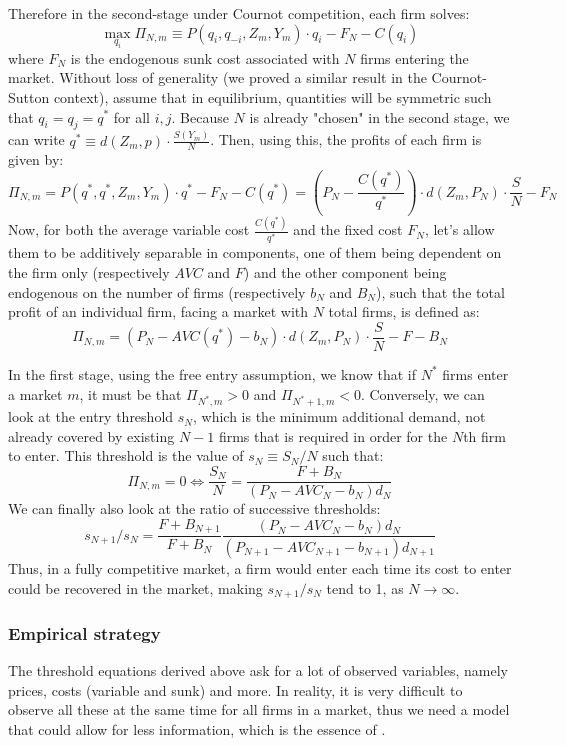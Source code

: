 \documentclass[12pt]{report}
\begin{document}
Therefore in the second-stage under Cournot competition, each firm solves: $$\max_{q_i}\Pi_{N,m} \equiv P(q_i, q_{-i}, Z_m, Y_m) \cdot q_i - F_N - C(q_i) $$ where $F_N$ is the endogenous sunk cost associated with $N$ firms entering the market. Without loss of generality (we proved a similar result in the Cournot-Sutton context), assume that in equilibrium, quantities will be symmetric such that $q_i = q_j = q^*$ for all $i,j$. Because $N$ is already "chosen" in the second stage, we can write $q^* \equiv d(Z_m, p)\cdot \frac{S(Y_m)}{N}$. Then, using this, the profits of each firm is given by: $$\Pi_{N,m} = P(q^*, q^*, Z_m, Y_m) \cdot q^* - F_N - C(q^*) = \left(P_N - \frac{C(q^*)}{q^*} \right) \cdot d(Z_m, P_N)\cdot \frac{S}{N} - F_N $$ Now, for both the average variable cost $\frac{C(q^*)}{q^*}$ and the fixed cost $F_N$, let's allow them to be additively separable in components, one of them being dependent on the firm only (respectively $AVC$ and $F$) and the other component being endogenous on the number of firms (respectively $b_N$ and $B_N$), such that the total profit of an individual firm, facing a market with $N$ total firms, is defined as: $$\Pi_{N,m} = \left(P_N - AVC(q^*) - b_N \right) \cdot d(Z_m, P_N)\cdot \frac{S}{N} - F - B_N $$

In the first stage, using the free entry assumption, we know that if $N^*$ firms enter a market $m$, it must be that $\Pi_{N^*,m} > 0$ and $\Pi_{N^*+1,m} < 0$. Conversely, we can look at the entry threshold $s_N$, which is the minimum additional demand, not already covered by existing $N-1$ firms that is required in order for the $N$th firm to enter. This threshold is the value of $s_N \equiv S_N/N$ such that: $$\Pi_{N,m} = 0 \Leftrightarrow \frac{S_N}{N} = \frac{F + B_N}{(P_N - AVC_N - b_N)d_N} $$ We can finally also look at the ratio of successive thresholds: $$s_{N+1}/s_N = \frac{F + B_{N+1}}{F + B_N}\frac{(P_N - AVC_{N} - b_N)d_N}{(P_{N+1} - AVC_{N+1} - b_{N+1})d_{N+1}} $$ Thus, in a fully competitive market, a firm would enter each time its cost to enter could be recovered in the market, making $s_{N+1}/s_N$ tend to 1, as $N\to\infty$.

\subsubsection{Empirical strategy}

The threshold equations derived above ask for a lot of observed variables, namely prices, costs (variable and sunk) and more. In reality, it is very difficult to observe all these at the same time for all firms in a market, thus we need a model that could allow for less information, which is the essence of \cite{br_91}.
\end{document}
